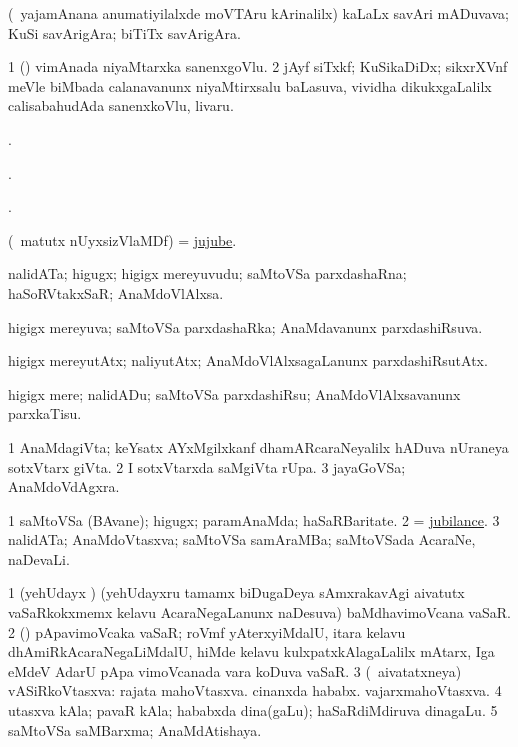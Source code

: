 \bentry
{}
\gl{\nA}
\bmng
(\kanmu\ yajamAnana anumatiyilalxde moVTAru kArinalilx) kaLaLx savAri mADuvava; KuSi savArigAra; biTiTx savArigAra. 
\emng
\eentry

\bentry
{}
\gl{\nA}
\bmng
\bnum
\num{1} (\AmA) vimAnada niyaMtarxka sanenxgoVlu. 
\num{2} jAyf siTxkf; KuSikaDiDx;  sikxrXVnf meVle biMbada calanavanunx niyaMtirxsalu baLasuva, vividha dikukxgaLalilx calisabahudAda sanenxkoVlu, livaru. 
\enum
\emng
\eentry

\bentry
{}
\gl{\saMkiSx}
\bmng
{}. 
\emng
\eentry

\bentry
{}
\gl{\saMkiSx}
\bmng
{}. 
\emng
\eentry

\bentry
{}
\gl{\saMkiSx}
\bmng
{}. 
\emng
\eentry

\bentry
{}
\gl{\nA}
\bmng
(\AseTxrXV\ matutx nUyxsizVlaMDf)  = \hyperlink{jujube}{jujube}. 
\emng
\eentry

\bentry
{}
\gl{\nA}
\bmng
nalidATa; higugx; higigx mereyuvudu; saMtoVSa parxdashaRna; haSoRVtakxSaR; AnaMdoVlAlxsa. 
\emng
\eentry

\bentry
{}
\gl{\gu}
\bmng
higigx mereyuva; saMtoVSa parxdashaRka; AnaMdavanunx parxdashiRsuva. 
\emng
\eentry

\bentry
{}
\gl{\kirxvi}
\bmng
higigx mereyutAtx; naliyutAtx; AnaMdoVlAlxsagaLanunx parxdashiRsutAtx. 
\emng
\eentry

\bentry
{}
\gl{\akirx}
\bmng
higigx mere; nalidADu; saMtoVSa parxdashiRsu; AnaMdoVlAlxsavanunx parxkaTisu. 
\emng
\eentry

\bentry
{}
\gl{\nA}
\bmng
\bnum
\num{1} AnaMdagiVta; keYsatx AYxMgilxkanf dhamARcaraNeyalilx hADuva nUraneya sotxVtarx giVta. 
\num{2} I sotxVtarxda saMgiVta rUpa. 
\num{3} jayaGoVSa; AnaMdoVdAgxra. 
\enum
\emng
\eentry

\bentry
{}
\gl{\nA}
\bmng
\bnum
\num{1} saMtoVSa (BAvane); higugx; paramAnaMda; haSaRBaritate. 
\num{2}  = \hyperlink{jubilance}{jubilance}. 
\num{3} nalidATa; AnaMdoVtasxva; saMtoVSa samAraMBa; saMtoVSada AcaraNe, naDevaLi. 
\enum
\emng
\eentry

\bentry
{}
\gl{\nA}
\bmng
\bnum
\num{1} (yehUdayx \ca) (yehUdayxru tamamx biDugaDeya sAmxrakavAgi aivatutx vaSaRkokxmemx kelavu AcaraNegaLanunx naDesuva) baMdhavimoVcana vaSaR. 
\num{2} (\roVkAyx) pApavimoVcaka vaSaR; roVmf yAterxyiMdalU, itara kelavu dhAmiRkAcaraNegaLiMdalU, hiMde kelavu kulxpatxkAlagaLalilx mAtarx, Iga eMdeV AdarU pApa vimoVcanada vara koDuva vaSaR. 
\num{3} (\kanmu\ aivatatxneya) vASiRkoVtasxva:  rajata mahoVtasxva.  cinanxda hababx.  vajarxmahoVtasxva. 
\num{4} utasxva kAla; pavaR kAla; hababxda dina(gaLu); haSaRdiMdiruva dinagaLu. 
\num{5} saMtoVSa saMBarxma; AnaMdAtishaya. 
\enum
\emng
\eentry

